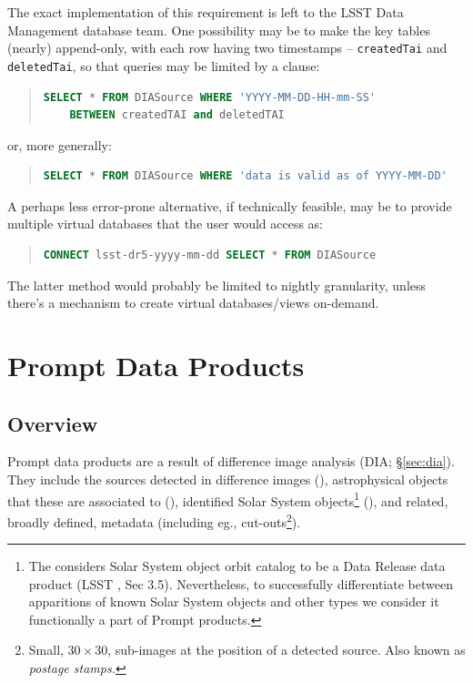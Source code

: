 \documentclass[SE,lsstdraft,toc]{lsstdoc}
\begin{document}
The exact implementation of this requirement is left to the LSST Data Management database team. One possibility may be to make the key tables (nearly) append-only, with each row having two timestamps -- \texttt{createdTai} and \texttt{deletedTai}, so that queries may be limited by a  clause:
\begin{quote}
\item \begin{lstlisting}[language=SQL]
SELECT * FROM DIASource WHERE 'YYYY-MM-DD-HH-mm-SS'
    BETWEEN createdTAI and deletedTAI
\end{lstlisting}
\end{quote}
%
or, more generally:
%
\begin{quote}
\item \begin{lstlisting}[language=SQL,showstringspaces=false]
SELECT * FROM DIASource WHERE 'data is valid as of YYYY-MM-DD'
\end{lstlisting}
\end{quote}
%
A perhaps less error-prone alternative, if technically feasible, may be to provide multiple virtual databases that the user would access as:
%
\begin{quote}
\item \begin{lstlisting}[language=SQL]
CONNECT lsst-dr5-yyyy-mm-dd SELECT * FROM DIASource
\end{lstlisting}
\end{quote}
%
The latter method would probably be limited to nightly granularity, unless there's a mechanism to create virtual databases/views on-demand.


\clearpage

\section{Prompt Data Products}
\label{sec:level1}

\subsection{Overview}

Prompt data products are a result of difference image analysis (DIA; \S \ref{sec:dia}). They include the sources detected in difference images (\DIASources), astrophysical objects that these are associated to (\DIAObjects), identified Solar System objects\footnote{The \SRD considers Solar System object orbit catalog to be a Data Release data product (LSST \SRD, Sec 3.5). Nevertheless, to successfully differentiate between apparitions of known Solar System objects and other types \DIASources we consider it functionally a part of Prompt products.} (\SSObject), and related, broadly defined, metadata (including eg., cut-outs\footnote{Small, $30 \times 30$, sub-images at the position of a detected source. Also known as \emph{postage stamps.}}).
\end{document}
